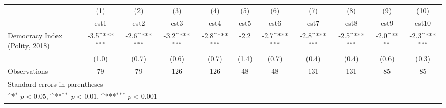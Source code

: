 {
\def\sym#1{\ifmmode^{#1}\else\(^{#1}\)\fi}
\begin{tabular}{l*{10}{c}}
\hline\hline
                    &\multicolumn{1}{c}{(1)}         &\multicolumn{1}{c}{(2)}         &\multicolumn{1}{c}{(3)}         &\multicolumn{1}{c}{(4)}         &\multicolumn{1}{c}{(5)}         &\multicolumn{1}{c}{(6)}         &\multicolumn{1}{c}{(7)}         &\multicolumn{1}{c}{(8)}         &\multicolumn{1}{c}{(9)}         &\multicolumn{1}{c}{(10)}         \\
                    &        est1         &        est2         &        est3         &        est4         &        est5         &        est6         &        est7         &        est8         &        est9         &       est10         \\
\hline
Democracy Index (Polity, 2018)&        -3.5\sym{***}&        -2.6\sym{***}&        -3.2\sym{***}&        -2.8\sym{***}&        -2.2         &        -2.7\sym{***}&        -2.8\sym{***}&        -2.5\sym{***}&        -2.0\sym{**} &        -2.3\sym{***}\\
                    &       (1.0)         &       (0.7)         &       (0.6)         &       (0.7)         &       (1.4)         &       (0.7)         &       (0.4)         &       (0.4)         &       (0.6)         &       (0.3)         \\
\hline
Observations        &          79         &          79         &         126         &         126         &          48         &          48         &         131         &         131         &          85         &          85         \\
\hline\hline
\multicolumn{11}{l}{\footnotesize Standard errors in parentheses}\\
\multicolumn{11}{l}{\footnotesize \sym{*} \(p<0.05\), \sym{**} \(p<0.01\), \sym{***} \(p<0.001\)}\\
\end{tabular}
}
